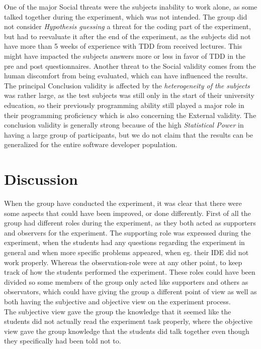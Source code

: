 \documentclass{sig-alternate-05-2015}
\begin{document}
One of the major Social threats were the subjects inability to work alone, as some talked together during the experiment, which was not intended. The group did not consider \textit{Hypothesis guessing} a threat for the coding part of the experiment, but had to reevaluate it after the end of the experiment, as the subjects did not have more than 5  weeks of experience with TDD from received lectures. This might have impacted the subjects answers more or less in favor of TDD in the pre and post questionnaires. Another threat to the Social validity comes from the human discomfort from being evaluated, which can have influenced the results.\\

The principal Conclusion validity is affected by the \textit{heterogeneity of the subjects} was rather large, as the test subjects was still only in the start of their university education, so their previously programming ability still played a major role in their programming proficiency which is also concerning the External validity. The conclusion validity is generally strong because of the high \textit{Statistical Power} in having a large group of participants, but we do not claim that the results can be generalized for the entire software developer population. 

\section{Discussion}

When the group have conducted the experiment, it was clear that there were some aspects that could have been improved, or done differently. First of all the group had different roles during the experiment, as they both acted as supporters and observers for the experiment. The supporting role was expressed during the experiment, when the students had any questions regarding the experiment in general and when more specific problems appeared, when eg. their IDE did not work properly. Whereas the observation-role were at any other point, to keep track of how the students performed the experiment. These roles could have been divided so some members of the group only acted like supporters and others as observators, which could have giving the group a different point of view as well as both having the subjective and objective view on the experiment process.\\

The subjective view gave the group the knowledge that it seemed like the students did not actually read the experiment task properly, where the objective view gave the group knowledge that the students did talk together even though they specifically had been told not to.
\end{document}
